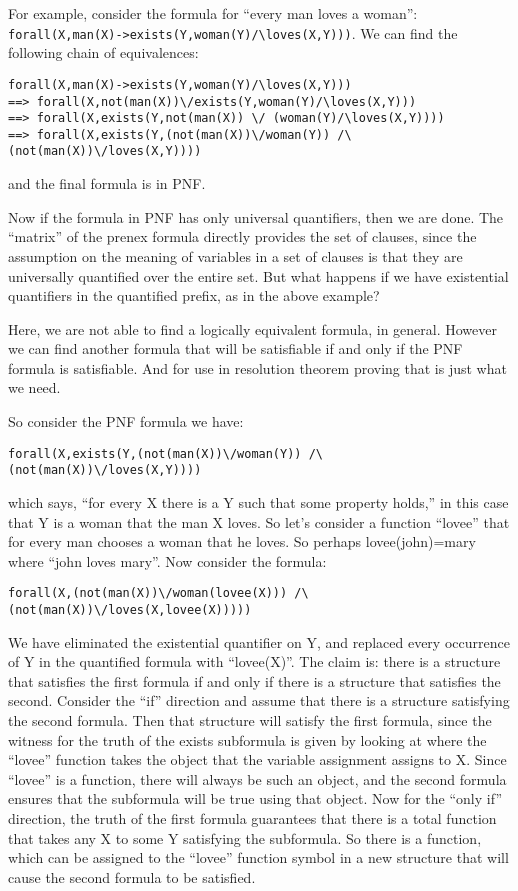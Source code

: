 For example, consider the formula for ``every man loves a woman'': \\
\verb|forall(X,man(X)->exists(Y,woman(Y)/\loves(X,Y)))|. We can find the
following chain of equivalences:
\begin{verbatim}
forall(X,man(X)->exists(Y,woman(Y)/\loves(X,Y)))
==> forall(X,not(man(X))\/exists(Y,woman(Y)/\loves(X,Y)))
==> forall(X,exists(Y,not(man(X)) \/ (woman(Y)/\loves(X,Y))))
==> forall(X,exists(Y,(not(man(X))\/woman(Y)) /\ (not(man(X))\/loves(X,Y))))
\end{verbatim}
and the final formula is in PNF.

Now if the formula in PNF has only universal quantifiers, then we are
done.  The ``matrix'' of the prenex formula directly provides the set
of clauses, since the assumption on the meaning of variables in a set
of clauses is that they are universally quantified over the entire
set.  But what happens if we have existential quantifiers in the
quantified prefix, as in the above example?

Here, we are not able to find a logically equivalent formula, in
general.  However we can find another formula that will be satisfiable
if and only if the PNF formula is satisfiable.  And for use in resolution
theorem proving that is just what we need.

So consider the PNF formula we have:
\begin{verbatim}
forall(X,exists(Y,(not(man(X))\/woman(Y)) /\ (not(man(X))\/loves(X,Y))))
\end{verbatim}
which says, ``for every X there is a Y such that some property
holds,'' in this case that Y is a woman that the man X loves.  So
let's consider a function ``lovee'' that for every man chooses a woman
that he loves.  So perhaps lovee(john)=mary where ``john loves mary''.
Now consider the formula:
\begin{verbatim}
forall(X,(not(man(X))\/woman(lovee(X))) /\ (not(man(X))\/loves(X,lovee(X)))))
\end{verbatim}
We have eliminated the existential quantifier on Y, and replaced every
occurrence of Y in the quantified formula with ``lovee(X)''.  The
claim is: there is a structure that satisfies the first formula if and
only if there is a structure that satisfies the second.  Consider the
``if'' direction and assume that there is a structure satisfying the
second formula.  Then that structure will satisfy the first formula,
since the witness for the truth of the exists subformula is given by
looking at where the ``lovee'' function takes the object that the
variable assignment assigns to X.  Since ``lovee'' is a function,
there will always be such an object, and the second formula ensures
that the subformula will be true using that object.  Now for the
``only if'' direction, the truth of the first formula guarantees that
there is a total function that takes any X to some Y satisfying the
subformula.  So there is a function, which can be assigned to the
``lovee'' function symbol in a new structure that will cause the
second formula to be satisfied.  

